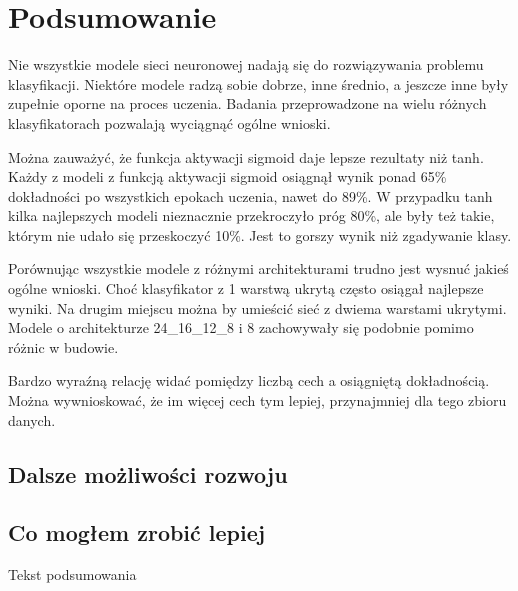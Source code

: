 \documentclass{report}
\begin{document}
    \chapter{Podsumowanie}\label{ch:podsumowanie}

    Nie wszystkie modele sieci neuronowej nadają się do rozwiązywania problemu klasyfikacji.
    Niektóre modele radzą sobie dobrze, inne średnio, a jeszcze inne były zupełnie oporne na proces uczenia.
    Badania przeprowadzone na wielu różnych klasyfikatorach pozwalają wyciągnąć ogólne wnioski.

    Można zauważyć, że funkcja aktywacji sigmoid daje lepsze rezultaty niż tanh.
    Każdy z modeli z funkcją aktywacji sigmoid osiągnął wynik ponad 65\% dokładności po wszystkich epokach uczenia, nawet do 89\%.
    W przypadku tanh kilka najlepszych modeli nieznacznie przekroczyło próg 80\%, ale były też takie, którym nie udało się przeskoczyć 10\%.
    Jest to gorszy wynik niż zgadywanie klasy.

    Porównując wszystkie modele z różnymi architekturami trudno jest wysnuć jakieś ogólne wnioski.
    Choć klasyfikator z 1 warstwą ukrytą często osiągał najlepsze wyniki.
    Na drugim miejscu można by umieścić sieć z dwiema warstami ukrytymi.
    Modele o architekturze 24\_16\_12\_8 i 8 zachowywały się podobnie pomimo różnic w budowie.

    Bardzo wyraźną relację widać pomiędzy liczbą cech a osiągniętą dokładnością.
    Można wywnioskować, że im więcej cech tym lepiej, przynajmniej dla tego zbioru danych.

    \section{Dalsze możliwości rozwoju}\label{sec:dalszeMozliwosciRozwoju}



    \section{Co mogłem zrobić lepiej}\label{sec:coMoglemZrobicLepiej}

    Tekst podsumowania

    
    

    \listoffigures
    \listoftables
\end{document}
